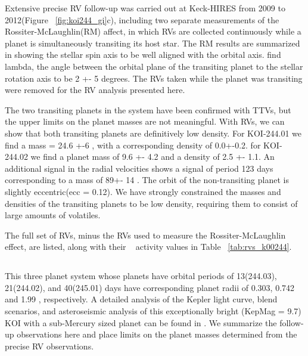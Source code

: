 \documentclass{emulateapj}
\begin{document}
Extensive precise RV follow-up was carried out at Keck-HIRES from 2009 to 2012(Figure  ~\ref{fig:koi244_gi}c), including two separate measurements of the Rossiter-McLaughlin(RM) affect, in which RVs are collected continuously while a planet is simultaneously transiting its host star. The RM results are summarized in \citep{Albrecht2013}  showing the stellar spin axis to be well aligned with the orbital axis. \cite{Albrecht2013} find lambda, the angle between the orbital plane of the transiting planet to the stellar rotation axis to be 2 +- 5 degrees. The RVs taken while the planet was transiting were removed for the RV analysis presented here.

The two transiting planets in the system have been confirmed with TTVs, but the upper limits on the planet masses are not meaningful. With RVs, we can show that both transiting planets are definitively low density. For KOI-244.01 we find a mass = 24.6 +-6 \mearthe, with a corresponding density of 0.0+-0.2\gcc. 
for KOI-244.02 we find a planet mass of 9.6 +- 4.2 and a density of 2.5 +- 1.1\gcc. An additional signal in the radial velocities shows a signal of period 123 days corresponding to a mass of 89+- 14 \mearthe. The orbit of the non-transiting planet is slightly eccentric(ecc = 0.12).  We have strongly constrained the masses and densities of the transiting planets to be low density, requiring them to consist of large amounts of volatiles.

The full set of RVs, minus the RVs used to measure the Rossiter-McLaughlin effect, are listed, along with their \rphk~ activity values in Table ~\ref{tab:rvs_k00244}.





\subsection{\koitwofourfive}  %

This three planet system whose planets have orbital periods of 13(244.03),  21(244.02),  and 40(245.01)  days have corresponding planet radii of 0.303, 0.742 and  1.99 \rearthe, respectively. A detailed analysis of the Kepler light curve, blend scenarios, and  asteroseismic analysis of this exceptionally bright  (KepMag = 9.7) KOI with a sub-Mercury sized planet can be found in \cite{Barclay2013}. We summarize the follow-up observations here and place limits on the planet masses determined from the precise RV observations.
\end{document}
